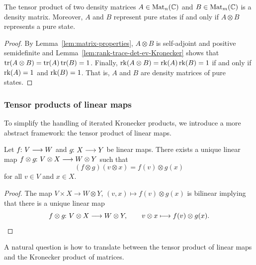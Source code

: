 \documentclass[a4paper, oneside, 12pt]{amsart}
\begin{document}
\begin{corollary}\label{cor:tensor-product-of-density-matrices}
  The tensor product of two density matrices \( A \in \operatorname{Mat}_{n}(\mathbb{C}) \) and \( B \in \operatorname{Mat}_{m}(\mathbb{C}) \) is a density matrix.
  Moreover, \(A\) and \(B\) represent pure states if and only if  \(A\otimes B\) represents a pure state.
\end{corollary}
\begin{proof}
  By Lemma~\ref{lem:matrix-properties}, \( A \otimes B \) is self-adjoint and positive semidefinite and Lemma~\ref{lem:rank-trace-det-ev-Kronecker} shows that \(\operatorname{tr}(A\otimes B) = \operatorname{tr}(A)\operatorname{tr}(B) = 1\).
  Finally, \(\operatorname{rk}(A\otimes B) = \operatorname{rk}(A)\operatorname{rk}(B) = 1\) if and only if \(\operatorname{rk}(A) = 1\) and \(\operatorname{rk}(B)=1\).
  That is, \(A\) and \(B\) are density matrices of pure states.
\end{proof}

\subsubsection{Tensor products of linear maps}\label{sec:tensor-products-of-linear-maps}

To simplify the handling of iterated Kronecker products, we introduce a more abstract framework: the tensor product of linear maps.

\begin{lemma}\label{lem:existence-tp-lin-maps}
  Let \( f \from V \to W \) and \( g \from X \to Y \) be linear maps.
  There exists a unique linear map \( f \otimes g \from V \otimes X \to W \otimes Y \) such that
  \begin{equation}
    (f \otimes g)(v \otimes x) = f(v) \otimes g(x)
  \end{equation}
  for all \( v \in V \) and \( x \in X \).
\end{lemma}
\begin{proof}
  The map \(V\times X \to W\otimes Y\), \((v, x) \mapsto f(v) \otimes g(x)\) is bilinear implying that there is a unique linear map
  \begin{equation*}
    f\otimes g \from V\otimes X \to W\otimes Y, \qquad v\otimes x \mapsto f(v) \otimes g(x). \qedhere
  \end{equation*}
\end{proof}

A natural question is how to translate between the tensor product of linear maps and the Kronecker product of matrices.
\end{document}
